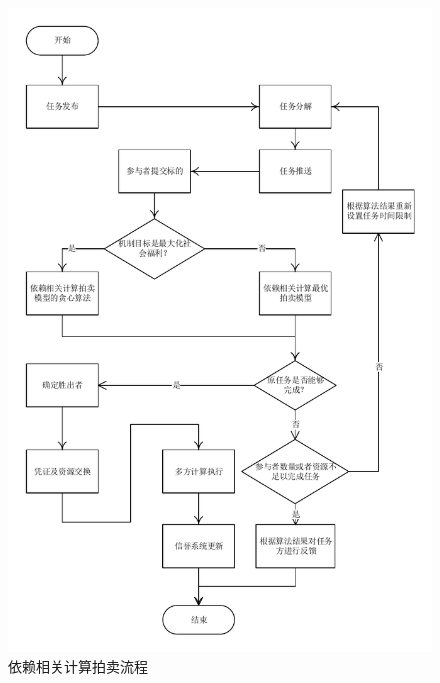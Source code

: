 \documentclass[promaster]{thesis-uestc}
\begin{document}
\begin{figure}[H]
    \includegraphics[width=350pt]{pic/yilaixiangguan.pdf}
    \caption{依赖相关计算拍卖流程}
\end{figure}
\end{document}
